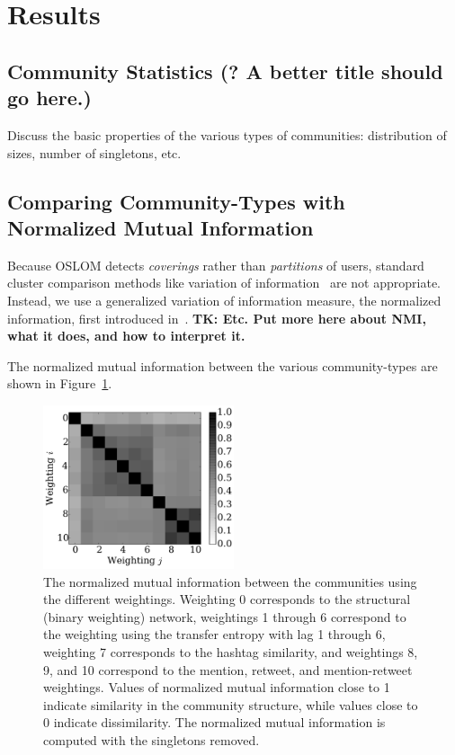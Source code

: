 \section{Results}

\subsection{Community Statistics (? A better title should go here.)}

Discuss the basic properties of the various types of communities: distribution of sizes, number of singletons, etc.

\subsection{Comparing Community-Types with Normalized Mutual Information}

Because OSLOM detects \emph{coverings} rather than \emph{partitions} of users, standard cluster comparison methods like variation of information~\cite{meilua2003comparing} are not appropriate. Instead, we use a generalized variation of information measure, the normalized information, first introduced in~\cite{lancichinetti2009detecting}. \textbf{TK: Etc. Put more here about NMI, what it does, and how to interpret it.}

The normalized mutual information between the various community-types are shown in Figure~\ref{Fig-compare_coverings}.

\begin{figure}[h!]
  \centering
\includegraphics[width=0.50\textwidth]{figures/nmi_singletons.pdf}
\caption{The normalized mutual information between the communities using the different weightings. Weighting 0 corresponds to the structural (binary weighting) network, weightings 1 through 6 correspond to the weighting using the transfer entropy with lag 1 through 6, weighting 7 corresponds to the hashtag similarity, and weightings 8, 9, and 10 correspond to the mention, retweet, and mention-retweet weightings. Values of normalized mutual information close to 1 indicate similarity in the community structure, while values close to 0 indicate dissimilarity. The normalized mutual information is computed with the singletons removed.}
\label{Fig-compare_coverings}
\end{figure}

